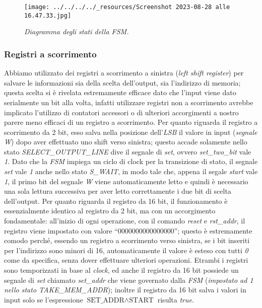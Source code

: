 \pagebreak

\begin{figure}
\centering
\texttt{[image: ../../../../\_resources/Screenshot 2023-08-28 alle 16.47.33.jpg]}
\caption{\emph{Diagramma degli stati della FSM.}}
\end{figure}

\pagebreak

\hypertarget{registri-a-scorrimento}{%
\subsubsection{Registri a scorrimento}\label{registri-a-scorrimento}}

Abbiamo utilizzato dei registri a scorrimento a sinistra (\emph{left
shift register}) per salvare le informazioni sia della scelta
dell'output, sia l'indirizzo di memoria; questa scelta si è rivelata
estremamente efficace dato che l'input viene dato serialmente un bit
alla volta, infatti utilizzare registri non a scorrimento avrebbe
implicato l'utilizzo di contatori accessori o di ulteriori accorgimenti
a nostro parere meno efficaci di un registro a scorrimento. Per quanto
riguarda il registro a scorrimento da 2 bit, esso salva nella posizione
dell'\emph{LSB} il valore in input (\emph{segnale W}) dopo aver
effettuato uno shift verso sinistra; questo accade solamente nello stato
\emph{SELECT\_OUTPUT\_LINE} dive il segnale di \emph{set}, ovvero
\emph{set\_two\_bit} vale \emph{1}. Dato che la \emph{FSM} impiega un
ciclo di clock per la transizione di stato, il segnale \emph{set} vale
\emph{1} anche nello stato \emph{S\_WAIT}, in modo tale che, appena il
segale \emph{start} vale \emph{1}, il primo bit del segnale \emph{W}
viene automaticamente letto e quindi è necessario una sola lettura
successiva per aver letto correttamente i due bit di scelta dell'output.
Per quanto riguarda il registro da 16 bit, il funzionamento è
essenzialmente identico al registro da 2 bit, ma con un accorgimento
fondamentale: all'inizio di ogni operazione, con il comando \emph{reset}
e \emph{rst\_addr}, il registro viene impostato con valore
``\(0000000000000000\)''; questo è estremamente comodo perché, essendo
un registro a scorrimento verso sinistra, se i bit inseriti per
l'indirizzo sono minori di 16, automaticamente il valore è esteso con
tutti \emph{0} come da specifica, senza dover effettuare ulteriori
operazioni. Etrambi i registri sono temporizzati in base al
\emph{clock}, ed anche il registro da 16 bit possiede un segnale di
\emph{set} chiamato \emph{set\_addr} che viene governato dalla
\emph{FSM} (\emph{impostato ad 1 nello stato TAKE\_MEM\_ADDR}); inoltre
il registro da 16 bit salva i valori in input solo se l'espressione
\(\text{SET\_ADDR}\land\text{START}\) risulta \emph{true}.

